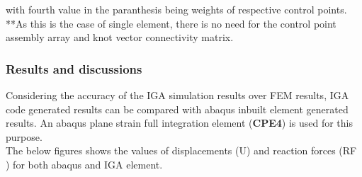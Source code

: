 \documentclass[11pt]{article}
\begin{document}
\begin{enumerate}
\begin{center}
\begin{tabular}{ |c|c|c|c|c| }
		\end{tabular}
	\end{center}
	with fourth value in the paranthesis being weights of respective control points.
	**As this is the case of single element, there is no need for the control point
	assembly array and knot vector connectivity matrix.
\end{enumerate}
\subsubsection{Results and discussions}
Considering the accuracy of the IGA simulation results over FEM results, IGA code generated results can be compared with abaqus inbuilt element generated results. An abaqus plane strain full integration element (\textbf{CPE4}) \cite{abaqus10version} is used for this purpose.
\\The below figures shows the values of displacements (U) and reaction forces (RF ) for both abaqus and IGA element.\\
\end{document}
